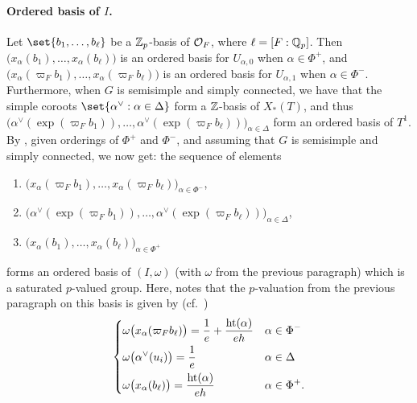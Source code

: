 \paragraph{Ordered basis of $I$.} Let $\set{b_{1},\dotsc,b_{\ell}}$ be a $\mathbb{Z}_{p}$-basis of $\mathcal{O}_{F}$, %
where $\ell = [F:\mathbb{Q}_{p}]$. Then $\bigl( x_{\alpha}(b_{1}), \dotsc, x_{\alpha}(b_{\ell}) \bigr)$ is an ordered basis for $U_{\alpha,0}$ when $\alpha \in \Phi^{+}$, and $\bigl( x_{\alpha}(\varpi_{F}b_{1}), \dotsc, x_{\alpha}(\varpi_{F}b_{\ell}) \bigr)$ is an ordered basis for $U_{\alpha,1}$ when $\alpha \in \Phi^{-}$. Furthermore, when $G$ is semisimple and simply connected, we have that the simple coroots $\set{ \alpha^{\vee} : \alpha \in \Delta }$ form a $\mathbb{Z}$-basis of $X_{*}(T)$, and thus $\bigl( \alpha^{\vee}(\exp(\varpi_{F}b_{1})), \dotsc, \alpha^{\vee}(\exp(\varpi_{F}b_{\ell})) \bigr)_{\alpha \in \Delta}$ form an ordered basis of $T^{1}$. By \cite[Cor.~3.6]{IwaBasis}, given orderings of $\Phi^{+}$ and $\Phi^{-}$, and assuming that $G$ is semisimple and simply connected, we now get: the sequence of elements
\begin{enumerate}[$\bullet$]
  \item $\bigl( x_{\alpha}(\varpi_{F}b_{1}), \dotsc, x_{\alpha}(\varpi_{F}b_{\ell}) \bigr)_{\alpha \in \Phi^{-}}$,
  \item $\bigl( \alpha^{\vee}(\exp(\varpi_{F}b_{1})), \dotsc, \alpha^{\vee}(\exp(\varpi_{F}b_{\ell})) \bigr)_{\alpha \in \Delta}$,
  \item $\bigl( x_{\alpha}(b_{1}), \dotsc, x_{\alpha}(b_{\ell}) \bigr)_{\alpha \in \Phi^{+}}$
\end{enumerate}
forms an ordered basis of $(I,\omega)$ (with $\omega$ from the previous paragraph) which is a saturated $p$-valued group. Here, \cite{IwaBasis} notes that the $p$-valuation from the previous paragraph on this basis is given by (cf.\ \cite[Prop.~3.4]{IwaBasis})
\begin{equation}
  \label{eq:Iwa-p-val-basis}
  \begin{dcases}
    \omega\bigl( x_{\alpha}(\varpi_{F}b_{\ell}) \bigr) = \frac{1}{e} + \frac{\operatorname{ht}(\alpha)}{eh}  & \alpha \in \Phi^{-} \\
    \omega\bigl( \alpha^{\vee}(u_{i}) \bigr) = \frac{1}{e} & \alpha \in \Delta \\
    \omega\bigl( x_{\alpha}(b_{\ell}) \bigr) = \frac{\operatorname{ht}(\alpha)}{eh} & \alpha \in \Phi^{+}.
  \end{dcases}
\end{equation}

